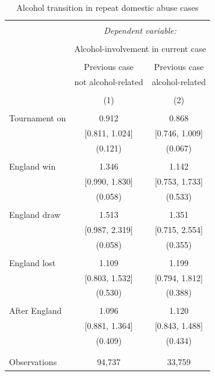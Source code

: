 \documentclass[12pt, a4paper]{article}
\begin{document}
\begin{table}
\centering
 \caption{Alcohol transition in repeat domestic abuse cases}
  \label{alctrans}
  \begin{threeparttable}
\begin{tabular}{@{\extracolsep{5pt}}lcc} 
\\[-1.8ex]\hline 
\hline \\[-1.8ex] 
 & \multicolumn{2}{c}{\textit{Dependent variable:}} \\ 
\cline{2-3} 
\\[-1.8ex] & \multicolumn{2}{c}{Alcohol-involvement in current case} \\ 
\\[-1.8ex] & Previous case & Previous case\\
& not alcohol-related & alcohol-related\\ 
\\[-1.8ex] & (1) & (2)\\ 
\hline \\[-1.8ex] 
Tournament on & 0.912 & 0.868 \\ 
  & [0.811, 1.024] & [0.746, 1.009] \\ 
  & (0.121) & (0.067) \\ 
  & & \\ 
 England win & 1.346 & 1.142 \\ 
  & [0.990, 1.830] & [0.753, 1.733] \\ 
  & (0.058) & (0.533) \\ 
  & & \\ 
 England draw & 1.513 & 1.351 \\ 
  & [0.987, 2.319] & [0.715, 2.554] \\ 
  & (0.058) & (0.355) \\ 
  & & \\ 
 England lost & 1.109 & 1.199 \\ 
  & [0.803, 1.532] & [0.794, 1.812] \\ 
  & (0.530) & (0.388) \\ 
  & & \\ 
 After England & 1.096 & 1.120 \\ 
  & [0.881, 1.364] & [0.843, 1.488] \\ 
  & (0.409) & (0.434) \\ 
  & & \\ 
\hline \\[-1.8ex] 
Observations & 94,737 & 33,759 \\


\end{tabular}
\end{threeparttable}
\end{table}
\end{document}
